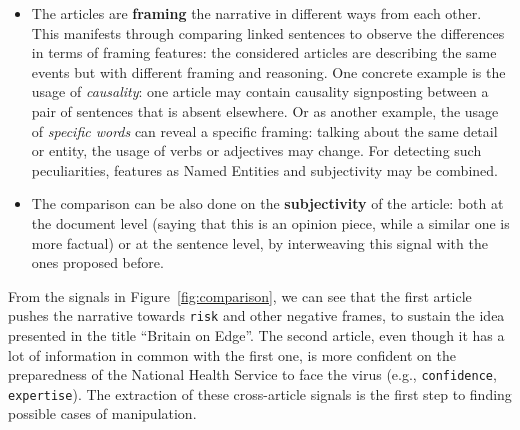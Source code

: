 \begin{itemize}
    \item The articles are \textbf{framing} the narrative in different ways from each other. This manifests through comparing linked sentences to observe the differences in terms of framing features: the considered articles are describing the same events but with different framing and reasoning.
    One concrete example is the usage of \emph{causality}: one article may contain causality signposting between a pair of sentences that is absent elsewhere.
    Or as another example, the usage of \emph{specific words} can reveal a specific framing: talking about the same detail or entity, the usage of verbs or adjectives may change.
    For detecting such peculiarities, %
    features as Named Entities and subjectivity may be combined.

    \item The comparison can be also done on the \textbf{subjectivity} of the article: both at the document level (saying that this is an opinion piece, while a similar one is more factual) or at the sentence level, by interweaving this signal with the ones proposed before.

\end{itemize}


From the signals in Figure~\ref{fig:comparison}, we can see that the first article pushes the narrative towards \texttt{risk} and other negative frames, to sustain the idea presented in the title ``Britain on Edge''.
The second article, even though it has a lot of information in common with the first one, is more confident on the preparedness of the National Health Service to face the virus (e.g., \texttt{confidence}, \texttt{expertise}).
The extraction of these cross-article signals is the first step to finding possible cases of manipulation.

